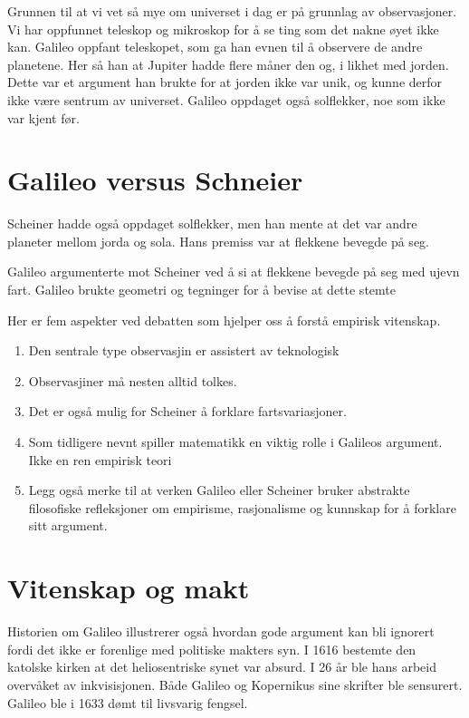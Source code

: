 \documentclass[11pt]{article}
\begin{document}
Grunnen til at vi vet så mye om universet i dag er på grunnlag av observasjoner. Vi har oppfunnet teleskop og mikroskop for å se
ting som det nakne øyet ikke kan. Galileo oppfant teleskopet, som ga han evnen til å observere de andre planetene. 
Her så han at Jupiter hadde flere måner den og, i likhet med jorden. Dette var et argument han brukte for at jorden ikke var unik, og kunne derfor ikke være sentrum av universet.
Galileo oppdaget også solflekker, noe som ikke var kjent før.


\section{Galileo versus Schneier}

Scheiner hadde også oppdaget solflekker, men han mente at det var andre planeter mellom jorda og sola. Hans premiss var at flekkene bevegde på seg.

Galileo argumenterte mot Scheiner ved å si at flekkene bevegde på seg med ujevn fart. Galileo brukte geometri og tegninger for å bevise at dette stemte

Her er fem aspekter ved debatten som hjelper oss å forstå empirisk vitenskap.

\begin{enumerate}
    \item Den sentrale type observasjin er assistert av teknologisk
    \item Observasjiner må nesten alltid tolkes.
    \item Det er også mulig for Scheiner å forklare fartsvariasjoner.
    \item Som tidligere nevnt spiller matematikk en viktig rolle i Galileos argument. Ikke en ren empirisk teori
    \item Legg også merke til at verken Galileo eller Scheiner bruker abstrakte filosofiske refleksjoner om empirisme, rasjonalisme og kunnskap for å forklare sitt argument.
\end{enumerate}


\section{Vitenskap og makt}

Historien om Galileo illustrerer også hvordan gode argument kan bli ignorert fordi det ikke er forenlige med politiske makters syn. I 1616 bestemte den katolske kirken at det heliosentriske synet var absurd. I 26 år ble hans arbeid overvåket av inkvisisjonen.
Både Galileo og Kopernikus sine skrifter ble sensurert. Galileo ble i 1633 dømt til livsvarig fengsel.
\end{document}
